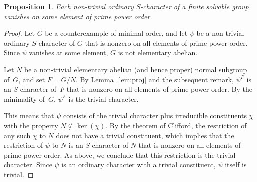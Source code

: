 \documentclass[10pt,a4paper]{amsart}
\newtheorem{prop}{Proposition}
\begin{document}
\begin{prop}\label{prop:solvnotord}
 Each non-trivial ordinary $S$-character of a finite solvable group vanishes on
 some element of prime power order.
\end{prop}

\begin{proof}
Let $G$ be a counterexample of minimal order, and let $\psi$ be a non-trivial
ordinary $S$-character of $G$ that is nonzero on all elements of prime power
order. Since $\psi$ vanishes at some element, $G$ is not elementary abelian.

Let $N$ be a non-trivial elementary abelian (and hence proper) normal subgroup
of~$G$, and set $F = G/N$. By Lemma~\ref{lem:proj} and the subsequent remark,
$\psi^F$ is an $S$-character of~$F$ that is nonzero on all elements of prime
power order. By the minimality of~$G$, $\psi^F$ is the trivial character.

This means that $\psi$ consists of the trivial character plus irreducible
constituents $\chi$ with the property $N \not\subseteq \ker(\chi)$.
By the theorem of Clifford, the restriction of any such $\chi$ to $N$ does not
have a trivial constituent, which implies that the restriction of $\psi$ to $N$
is an $S$-character of $N$ that is nonzero on all elements of prime power order.
As above, we conclude that this restriction is the trivial character.
Since $\psi$ is an ordinary character with a trivial constituent,
$\psi$ itself is trivial.
\end{proof}
\end{document}
